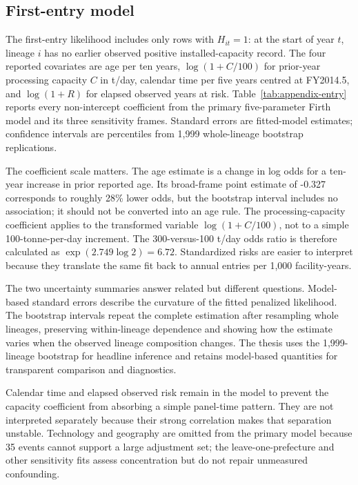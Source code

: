 \documentclass[12pt,a4paper]{article}
\begin{document}
\subsection{First-entry model}

The first-entry likelihood includes only rows with $H_{it}=1$: at the start of
year $t$, lineage $i$ has no earlier observed positive installed-capacity
record. The four reported covariates are age per ten years,
$\log(1+C/100)$ for prior-year processing capacity $C$ in t/day, calendar time
per five years centred at FY2014.5, and $\log(1+R)$ for elapsed observed years
at risk. Table~\ref{tab:appendix-entry} reports every non-intercept coefficient
from the primary five-parameter Firth model and its three sensitivity frames.
Standard errors are fitted-model estimates; confidence intervals are
percentiles from 1,999 whole-lineage bootstrap replications.

The coefficient scale matters. The age estimate is a change in log odds for a
ten-year increase in prior reported age. Its broad-frame point estimate of
-0.327 corresponds to roughly 28\% lower odds, but the bootstrap interval
includes no association; it should not be converted into an age rule. The
processing-capacity coefficient applies to the transformed variable
$\log(1+C/100)$, not to a simple 100-tonne-per-day increment. The
300-versus-100 t/day odds ratio is therefore calculated as
$\exp(2.749\log 2)=6.72$. Standardized risks are easier to interpret because
they translate the same fit back to annual entries per 1,000 facility-years.

The two uncertainty summaries answer related but different questions.
Model-based standard errors describe the curvature of the fitted penalized
likelihood. The bootstrap intervals repeat the complete estimation after
resampling whole lineages, preserving within-lineage dependence and showing how
the estimate varies when the observed lineage composition changes. The thesis
uses the 1,999-lineage bootstrap for headline inference and retains model-based
quantities for transparent comparison and diagnostics.

Calendar time and elapsed observed risk remain in the model to prevent the
capacity coefficient from absorbing a simple panel-time pattern. They are not
interpreted separately because their strong correlation makes that separation
unstable. Technology and geography are omitted from the primary model because
35 events cannot support a large adjustment set; the leave-one-prefecture and
other sensitivity fits assess concentration but do not repair unmeasured
confounding.
\end{document}
